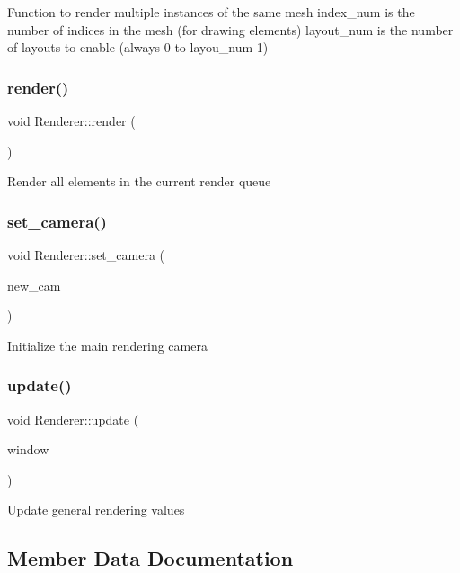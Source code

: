 Function to render multiple instances of the same mesh index\+\_\+num is the number of indices in the mesh (for drawing elements) layout\+\_\+num is the number of layouts to enable (always 0 to layou\+\_\+num-\/1) \mbox{\label{classRenderer_af7e5f8f68742f198e315fb4683a605a4}} 
\subsubsection{\texorpdfstring{render()}{render()}}
{\footnotesize\ttfamily void Renderer\+::render (\begin{DoxyParamCaption}{ }\end{DoxyParamCaption})}

Render all elements in the current render queue \mbox{\label{classRenderer_a6d8650dd5617e17865aaab8ce409642b}} 
\subsubsection{\texorpdfstring{set\+\_\+camera()}{set\_camera()}}
{\footnotesize\ttfamily void Renderer\+::set\+\_\+camera (\begin{DoxyParamCaption}\item[{\mbox{\hyperlink{classCamera}{Camera}} $\ast$}]{new\+\_\+cam }\end{DoxyParamCaption})}

Initialize the main rendering camera \mbox{\label{classRenderer_a34ac63c7fe0611ece146dc504aecb815}} 
\subsubsection{\texorpdfstring{update()}{update()}}
{\footnotesize\ttfamily void Renderer\+::update (\begin{DoxyParamCaption}\item[{G\+L\+F\+Wwindow $\ast$}]{window }\end{DoxyParamCaption})}

Update general rendering values 

\subsection{Member Data Documentation}
\mbox{\label{classRenderer_a044abbf0e0cbe0446bec0d0f00b2d060}} 

